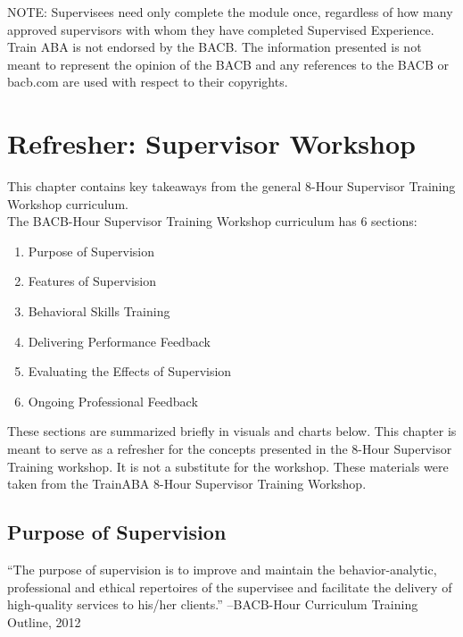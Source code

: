 NOTE: Supervisees need only complete the module once, regardless of how many approved supervisors with whom they have completed Supervised Experience.\\

Train ABA is not endorsed by the BACB. The information presented is not meant to represent the opinion of the BACB and any references to the BACB or bacb.com are used with respect to their copyrights.\\
%
%
%
%
%
%
%
%
%
%
%
%
%
%
%
%
%
%
%
%
%
%
\chapter{Refresher: Supervisor Workshop}

This chapter contains key takeaways from the general 8-Hour Supervisor Training Workshop curriculum.\\

The BACB-Hour Supervisor Training Workshop curriculum has 6 sections:
\begin{enumerate}
\item Purpose of Supervision
\item  Features of Supervision
\item  Behavioral Skills Training
\item  Delivering Performance Feedback
\item  Evaluating the Effects of Supervision
\item  Ongoing Professional Feedback
\end{enumerate}

These sections are summarized briefly in visuals and charts below. This chapter is meant to serve as a refresher for the concepts presented in the 8-Hour Supervisor Training workshop. It is not a substitute for the workshop. These materials were taken from the TrainABA 8-Hour Supervisor Training Workshop. 

\section{Purpose of Supervision}
%
``The purpose of supervision is to improve and maintain the behavior-analytic, professional and ethical repertoires of the supervisee and facilitate the delivery of high-quality services to his/her clients.''
--BACB-Hour Curriculum Training Outline, 2012
%
